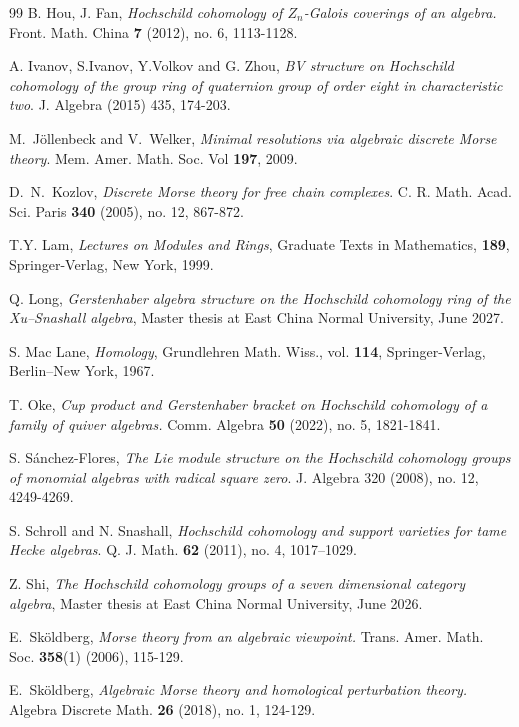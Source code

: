 \documentclass[10pt, reqno]{amsart}
\theoremstyle{definition}
\theoremstyle{remark}
\numberwithin{equation}{section}
\begin{document}
\begin{thebibliography}{99}
 B. Hou,   J. Fan,  
\emph{Hochschild cohomology of $Z_n$-Galois coverings of an algebra.}
Front. Math. China \textbf{7} (2012), no. 6, 1113-1128.

  A. Ivanov, S.Ivanov, Y.Volkov and G. Zhou, \emph{BV structure on Hochschild cohomology of the group ring of quaternion group of order eight in characteristic two}. J. Algebra (2015) 435, 174-203.

  M.~J\"{o}llenbeck and  V.~Welker,
\emph{Minimal resolutions via algebraic discrete Morse theory}. Mem. Amer.
Math. Soc. Vol \textbf{197}, 2009.

  D.~N.~Kozlov, \emph{Discrete Morse theory for free chain complexes}. C. R. Math. Acad. Sci. Paris  \textbf{340}  (2005),  no. 12, 867-872.

T.Y. Lam, \emph{Lectures on Modules and Rings}, Graduate Texts in Mathematics, \textbf{189}, Springer-Verlag, New York, 1999.

Q. Long, \emph{Gerstenhaber algebra structure on the Hochschild cohomology ring of the Xu--Snashall algebra},  Master thesis at East China Normal University, June 2027.

  S. Mac Lane, \emph{Homology}, Grundlehren Math. Wiss., vol. \textbf{114}, Springer-Verlag, Berlin–New York,
1967.


 T. Oke, 
\emph{Cup product and Gerstenhaber bracket on Hochschild cohomology of a family of quiver algebras.}
Comm. Algebra \textbf{50} (2022), no. 5, 1821-1841.

 S. S\'anchez-Flores, \emph{The Lie module structure on the Hochschild cohomology groups of monomial algebras with radical square zero}. J. Algebra 320 (2008), no. 12, 4249-4269.

 S. Schroll and N. Snashall, \emph{Hochschild cohomology and support varieties for tame Hecke algebras}. Q. J. Math.  \textbf{62}  (2011),  no. 4, 1017–1029.

Z. Shi, \emph{The Hochschild cohomology groups 
of a seven dimensional category algebra},  Master thesis at East China Normal University, June 2026.

  E.~Sk\"{o}ldberg,
\emph{Morse theory from an algebraic viewpoint.}
Trans. Amer. Math. Soc. \textbf{358}(1) (2006), 115-129.

  E.~Sk\"{o}ldberg,
\emph{Algebraic Morse theory and homological perturbation theory. } Algebra Discrete Math.  \textbf{26}  (2018),  no. 1, 124-129.


\end{thebibliography}
\end{document}
